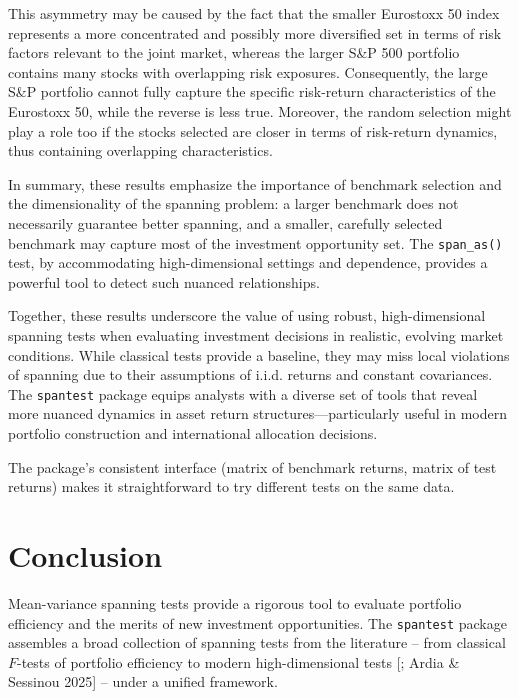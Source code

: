 This asymmetry may be caused by the fact that the smaller Eurostoxx 50
index represents a more concentrated and possibly more diversified set
in terms of risk factors relevant to the joint market, whereas the
larger S\&P 500 portfolio contains many stocks with overlapping risk
exposures. Consequently, the large S\&P portfolio cannot fully capture
the specific risk-return characteristics of the Eurostoxx 50, while the
reverse is less true. Moreover, the random selection might play a role
too if the stocks selected are closer in terms of risk-return dynamics,
thus containing overlapping characteristics.

In summary, these results emphasize the importance of benchmark
selection and the dimensionality of the spanning problem: a larger
benchmark does not necessarily guarantee better spanning, and a smaller,
carefully selected benchmark may capture most of the investment
opportunity set. The \texttt{span\_as()} test, by accommodating high-dimensional
settings and dependence, provides a powerful tool to detect such nuanced
relationships.

Together, these results underscore the value of using robust,
high-dimensional spanning tests when evaluating investment decisions in
realistic, evolving market conditions. While classical tests provide a
baseline, they may miss local violations of spanning due to their
assumptions of i.i.d. returns and constant covariances. The \texttt{spantest}
package equips analysts with a diverse set of tools that reveal more
nuanced dynamics in asset return structures---particularly useful in
modern portfolio construction and international allocation decisions.

The package's consistent interface (matrix of benchmark returns, matrix
of test returns) makes it straightforward to try different tests on the
same data.

\section{Conclusion}\label{conclusion}

Mean-variance spanning tests provide a rigorous tool to evaluate
portfolio efficiency and the merits of new investment opportunities. The
\texttt{spantest} package assembles a broad collection of spanning tests from
the literature -- from classical \(F\)-tests of portfolio efficiency
\citep{GRS1989} to modern high-dimensional tests {[}\citet{GungorLuger2016}; Ardia \&
Sessinou 2025{]} -- under a unified framework.

